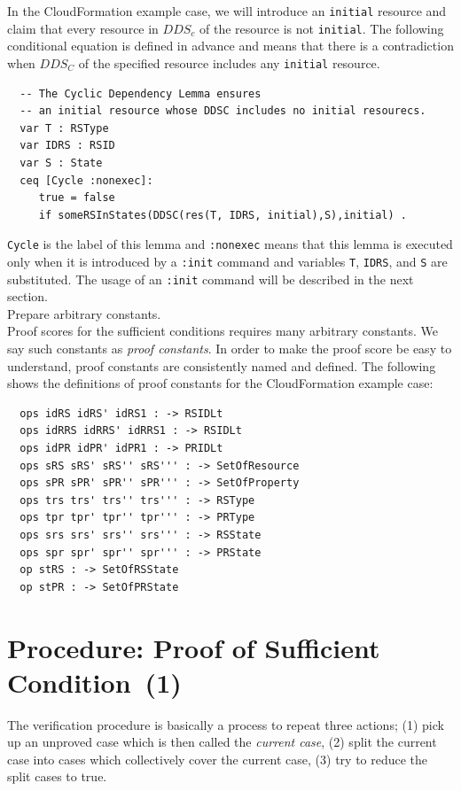 \documentclass[12pt]{report}
\begin{document}
In the CloudFormation example case, we will introduce an {\tt initial}
resource and claim that every resource in $\mathit{DDS_c}$ of the resource is
not {\tt initial}. The following conditional equation is defined in
advance and means that there is a contradiction when $\mathit{DDS_C}$ of the
specified resource includes any {\tt initial} resource.
\small
\begin{verbatim}
  -- The Cyclic Dependency Lemma ensures
  -- an initial resource whose DDSC includes no initial resourecs.
  var T : RSType
  var IDRS : RSID
  var S : State
  ceq [Cycle :nonexec]: 
     true = false
     if someRSInStates(DDSC(res(T, IDRS, initial),S),initial) .
\end{verbatim}
\normalsize
{\tt Cycle} is the label of this lemma and {\tt :nonexec} means that
this lemma is executed only when it is introduced by a {\tt :init}
command and variables {\tt T}, {\tt IDRS}, and {\tt S} are
substituted. The usage of an {\tt :init} command will be described in
the next section.\\

 Prepare arbitrary constants. \\
Proof scores for the sufficient conditions requires many arbitrary constants.
We say such constants as {\it proof constants}.
In order to make the proof score be easy to understand, proof constants
are consistently named and defined. The following shows the definitions
of proof constants for the CloudFormation example case:
\small
\begin{verbatim}
  ops idRS idRS' idRS1 : -> RSIDLt
  ops idRRS idRRS' idRRS1 : -> RSIDLt
  ops idPR idPR' idPR1 : -> PRIDLt
  ops sRS sRS' sRS'' sRS''' : -> SetOfResource
  ops sPR sPR' sPR'' sPR''' : -> SetOfProperty
  ops trs trs' trs'' trs''' : -> RSType
  ops tpr tpr' tpr'' tpr''' : -> PRType
  ops srs srs' srs'' srs''' : -> RSState
  ops spr spr' spr'' spr''' : -> PRState
  op stRS : -> SetOfRSState
  op stPR : -> SetOfPRState
\end{verbatim}
\normalsize
\section{Procedure: Proof of Sufficient Condition~(1)}
\label{sec:initcont}
The verification procedure is basically a process to repeat three
actions; (1) pick up an unproved case which is then called the
{\it current case}, (2) split the current case into cases which
collectively cover the current case, (3) try to reduce the split cases
to true.\\
\end{document}

